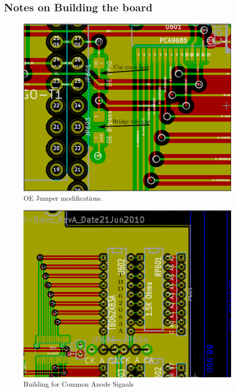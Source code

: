 \subsection{Notes on Building the board}

\begin{figure}[hbpt]\begin{centering}%
\includegraphics[width=5in]{ESP32-PWMHalfSidingOEEnableMods.png}
\caption{OE Jumper modifications.}
\label{fig:ESP32-PWMHalfSidingOEEnableMods}
\end{centering}\end{figure}
\begin{figure}[hbpt]\begin{centering}%
\includegraphics[width=5in]{ESP32-PWMHalfSidingCommonAnodeLamps.png}
\caption{Building for Common Anode Signals}
\label{fig:ESP32-PWMHalfSidingCommonAnodeLamps}
\end{centering}\end{figure} 
